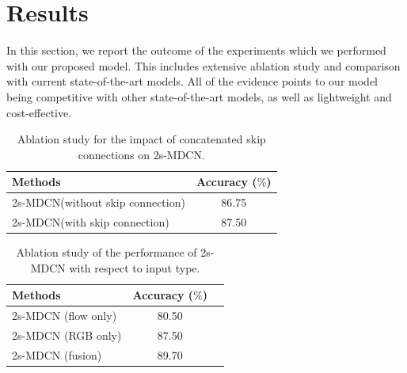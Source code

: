 

\section{Results}
    In this section, we report the outcome of the experiments which we performed with our proposed model. This includes extensive ablation study and  comparison with current state-of-the-art models. All of the evidence points to our model being competitive with other state-of-the-art models, as well as lightweight and cost-effective.
     
     
        \begin{table}[htp]
    \begin{center}
		\begin{tabular}{lc}
			\hline
			Methods     &  Accuracy ($\%$)    \\
			\hline
            2s-MDCN(without skip connection)    &      86.75  \\
            2s-MDCN(with skip connection)    &      87.50 \\
            \hline
		\end{tabular}
    \end{center}
	\caption{Ablation study for the impact of concatenated skip connections on 2s-MDCN.}
    \label{tab:abl_skip}
	\end{table}
	
	
		\begin{table}[htp]
    \begin{center}
		\begin{tabular}{lcc}
			\hline
			Methods    &  Accuracy ($\%$)    \\
			\hline
            2s-MDCN (flow only)   &  80.50  \\
            2s-MDCN (RGB only)    &  87.50 \\
            2s-MDCN (fusion)   & 89.70 \\
            \hline
		\end{tabular}
    \end{center}
	\caption{Ablation study of the performance of 2s-MDCN with respect to input type.}
    \label{tab:abl_frame}
	\end{table}
	



